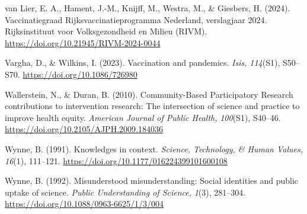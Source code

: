 \documentclass[authordate, reflection,issue]{jote-new-article}
\begin{document}
	van Lier, E. A., Hament, J.-M., Knijff, M., Westra, M., \& Giesbers, H. (2024). Vaccinatiegraad Rijksvaccinatieprogramma Nederland, verslagjaar 2024. Rijksinstituut voor Volksgezondheid en Milieu (RIVM). \url{https://doi.org/10.21945/RIVM-2024-0044}



	Vargha, D., \& Wilkins, I. (2023). Vaccination and pandemics. \emph{Isis,} \emph{114}(S1), S50--S70. \url{https://doi.org/10.1086/726980}



	Wallerstein, N., \& Duran, B. (2010). Community-Based Participatory Research contributions to intervention research: The intersection of science and practice to improve health equity. \emph{American Journal of Public Health,} \emph{100}(S1), S40--46. \url{https://doi.org/10.2105/AJPH.2009.184036}



	Wynne, B. (1991). Knowledges in context. \emph{Science, Technology, \& Human Values,} \emph{16}(1), 111--121. \url{https://doi.org/10.1177/016224399101600108}



	Wynne, B. (1992). Misunderstood misunderstanding: Social identities and public uptake of science. \emph{Public Understanding of Science,} \emph{1}(3), 281--304. \url{https://doi.org/10.1088/0963-6625/1/3/004}
\end{document}
